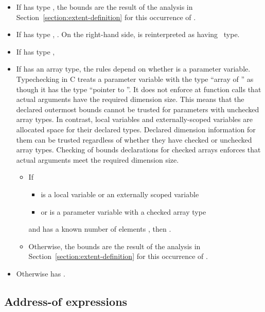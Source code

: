 \begin{itemize}
\item
  If  has type \arrayptr, the bounds are the result of
  the analysis in Section~\ref{section:extent-definition}
  for this occurrence of .
\item
  If  has type \ptrT, 
  .
   On the right-hand side,  is reinterpreted as having \arrayptr\ type.
\item
  If  has type
  \spanptrT, 
\item
  If  has an array type, the rules depend on whether   is a parameter
  variable.  Typechecking in C treats a parameter variable with the type ``array of ''
   as though it has the type ``pointer to ''.   It does not enforce 
  at function calls that actual arguments have the required dimension size.  This means
  that the declared outermost bounds cannot be trusted for parameters with unchecked
  array types.  In contrast, local variables and externally-scoped variables are allocated 
  space for their declared types.  Declared dimension information for them can be trusted 
  regardless of whether they have checked or unchecked array types.  Checking of bounds 
  declarations for checked arrays  enforces that actual arguments meet the required
  dimension size.
\begin{itemize}
\item If 
\begin{itemize} 
\item {} is a local variable or an externally scoped variable 
\item or  is a parameter variable with a checked array type
\end{itemize}
and  has a known number of elements , then  
  .
\item Otherwise, the bounds are the result of the analysis in 
  Section~\ref{section:extent-definition} for this occurrence of .
\end{itemize}
\item  Otherwise  has \boundsnone.
\end{itemize}

\subsection{Address-of expressions}
\label{section:address-of-expression-bounds}

